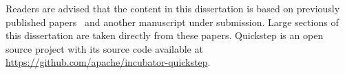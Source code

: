 Readers are advised that the content in this dissertation is based on previously published papers~\cite{quickstep-vldb, original, supplement} and another manuscript under submission.
Large sections of this dissertation are taken directly from these papers. 
Quickstep is an open source project with its source code available at \url{https://github.com/apache/incubator-quickstep}.

